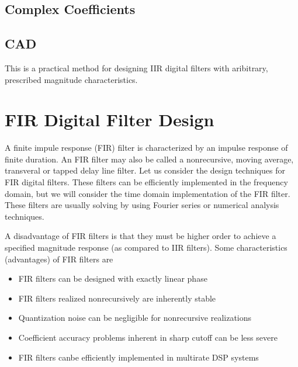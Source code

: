 \documentclass[11pt]{book}
\theoremstyle{example}
\begin{document}
\subsection{Complex Coefficients}

\subsection{CAD}

This is a practical method for designing IIR digital filters with aribitrary, prescribed magnitude characteristics.

\section{FIR Digital Filter Design}

A finite impule response (FIR) filter is characterized by an impulse response of finite duration. An FIR filter may also be called a nonrecursive, moving average, transveral or tapped delay line filter. Let us consider the design techniques for FIR digital filters. These filters can be efficiently implemented in the frequency domain, but we will consider the time domain implementation of the FIR filter. These filters are usually solving by using Fourier series or numerical analysis techniques.

A disadvantage of FIR filters is that they must be higher order to achieve a specified magnitude response (as compared to IIR filters). Some characteristics (advantages) of FIR filters are
\begin{itemize}
	\item FIR filters can be designed with exactly linear phase
	\item FIR filters realized nonrecursively are inherently stable
	\item Quantization noise can be negligible for nonrecursive realizations
	\item Coefficient accuracy problems inherent in sharp cutoff can be less severe
	\item FIR filters canbe efficiently implemented in multirate DSP systems
\end{itemize}
\end{document}
